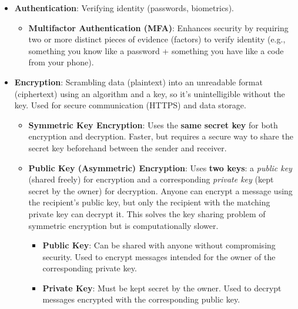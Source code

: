 \documentclass[11pt,oneside]{book}
\begin{document}
\begin{itemize}
\begin{itemize}
            \item \textbf{Authentication}: Verifying identity (passwords, biometrics).
                \begin{itemize}
                    \item \textbf{Multifactor Authentication (MFA)}: Enhances security by requiring two or more distinct pieces of evidence (factors) to verify identity (e.g., something you know like a password + something you have like a code from your phone).
                \end{itemize}
            \item \textbf{Encryption}: Scrambling data (plaintext) into an unreadable format (ciphertext) using an algorithm and a key, so it's unintelligible without the key. Used for secure communication (HTTPS) and data storage.
                \begin{itemize}
                    \item \textbf{Symmetric Key Encryption}: Uses the \textbf{same secret key} for both encryption and decryption. Faster, but requires a secure way to share the secret key beforehand between the sender and receiver.
                    \item \textbf{Public Key (Asymmetric) Encryption}: Uses \textbf{two keys}: a \textit{public key} (shared freely) for encryption and a corresponding \textit{private key} (kept secret by the owner) for decryption. Anyone can encrypt a message using the recipient's public key, but only the recipient with the matching private key can decrypt it. This solves the key sharing problem of symmetric encryption but is computationally slower.
                        \begin{itemize}
                            \item \textbf{Public Key}: Can be shared with anyone without compromising security. Used to encrypt messages intended for the owner of the corresponding private key.
                            \item \textbf{Private Key}: Must be kept secret by the owner. Used to decrypt messages encrypted with the corresponding public key.
                        \end{itemize}
                \end{itemize}
            \begin{figure}[h!]
                \centering
                \begin{tikzpicture}[every node/.style={draw, rounded corners, align=center, minimum height=1.2cm, minimum width=2.5cm}]

\end{tikzpicture}
\end{figure}
\end{itemize}
\end{itemize}
\end{document}
